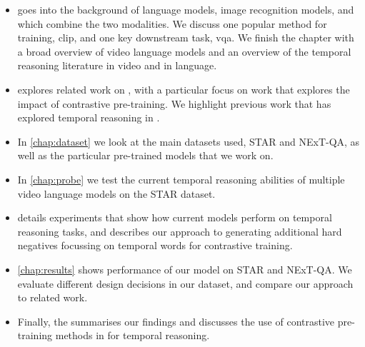 \begin{itemize}
	\item {} goes into the background of language models, image
		recognition models, and  which combine the two
		modalities. We discuss one popular method for training, \Acrfull{clip},
		and one key downstream task, \acrlong{vqa}. We finish the chapter with
		a broad overview of video language models and an overview of the
		temporal reasoning literature in video and in language.
	\item {} explores related work on ,
		with a particular focus on work that explores the impact of contrastive
		pre-training. We highlight previous work that has explored
		temporal reasoning in .
	\item In \cref{chap:dataset} we look at the main datasets used, STAR and
		NExT-QA, as well as the particular pre-trained models that we work on.
	\item In \cref{chap:probe} we test the current temporal reasoning abilities
		of multiple video language models on the STAR dataset.
	\item {} details experiments that show how current
		models perform on temporal reasoning tasks, and describes our approach
		to generating additional hard negatives focussing on temporal words for
		contrastive training.
	\item \cref{chap:results} shows performance of our model on STAR and NExT-QA.
		We evaluate different design decisions in our dataset, and compare our
		approach to related work.
	\item Finally, the  summarises our findings and
		discusses the use of contrastive pre-training methods in
		 for temporal reasoning.
\end{itemize}
